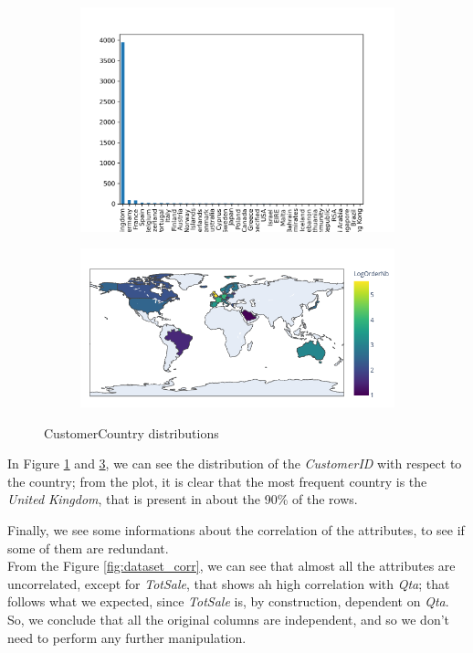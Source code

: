 \begin{figure}[!h]
\begin{subfigure}{.49\textwidth}
\centering
\includegraphics[width=.93\textwidth]{img/orders_country_bar.png}
\caption{}
\label{fig:orders_country_bar}
\end{subfigure}
\begin{subfigure}{.49\textwidth}
\centering
\includegraphics[width=.93\textwidth]{img/orders_country.png}
\caption{}
\label{fig:orders_country}
\end{subfigure}
\caption{CustomerCountry distributions}
\end{figure}

In Figure \ref{fig:orders_country_bar} and \ref{fig:orders_country}, we can see the distribution of the \emph{CustomerID} with respect to the country; from the plot, it is clear that the most frequent country is the \emph{United Kingdom}, that is present in about the 90\% of the rows.

Finally, we see some informations about the correlation of the attributes, to see if some of them are redundant.\\
From the Figure \ref{fig:dataset_corr}, we can see that almost all the attributes are uncorrelated, except for \emph{TotSale}, that shows ah high correlation with \emph{Qta}; that follows what we expected, since \emph{TotSale} is, by construction, dependent on \emph{Qta}. So, we conclude that all the original columns are independent, and so we don't need to perform any further manipulation.

